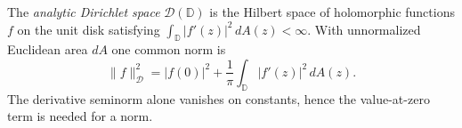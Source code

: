 
The \emph{analytic Dirichlet space} $\mathcal D(\mathbb D)$ is the Hilbert space of holomorphic functions $f$ on the unit disk satisfying $\int_{\mathbb D}|f'(z)|^2\,dA(z)<\infty$. With unnormalized Euclidean area $dA$ one common norm is
\[
\|f\|_{\mathcal D}^2=|f(0)|^2+\frac1\pi\int_{\mathbb D}|f'(z)|^2\,dA(z).
\]
The derivative seminorm alone vanishes on constants, hence the value-at-zero term is needed for a norm.
